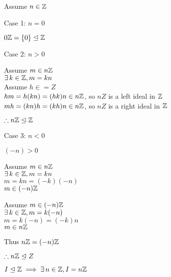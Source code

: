 \documentclass[letterpaper,12pt,fleqn]{article}
\newcommand{\ide}{\trianglelefteq}
\begin{document}
\begin{theproof}
  Assume $n\in\mathbb{Z}$
  
  \begin{description}
  \item Case 1: $n=0$
    
    $0\Z=\{0\}\ide\Z$

  \item Case 2: $n>0$

    Assume $m\in n\mathbb{Z}$ \\
    $\exists\,k\in\mathbb{Z},m=kn$ \\
    Assume $h\in=Z$ \\
    $hm=h(kn)=(hk)n\in n\mathbb{Z}$, so $nZ$ is a left ideal in $\mathbb{Z}$ \\
    $mh=(kn)h=(kh)n\in n\mathbb{Z}$, so $nZ$ is a right ideal in $\mathbb{Z}$

    $\therefore n\Z\ide\Z$

  \item Case 3: $n<0$

    $(-n)>0$

    Assume $m\in n\mathbb{Z}$ \\
    $\exists\,k\in\mathbb{Z},m=kn$ \\
    $m=kn=(-k)(-n)$ \\
    $m\in (-n)\mathbb{Z}$

    Assume $m\in(-n)\mathbb{Z}$ \\
    $\exists\,k\in\mathbb{Z},m=k(-n)$ \\
    $m=k(-n)=(-k)n$ \\
    $m\in n\mathbb{Z}$

    Thus $n\mathbb{Z}=(-n)\mathbb{Z}$

    $\therefore n\Z\ide Z$
  \end{description}
\end{theproof}

\begin{theorem}
  $I\ide\Z\implies\exists\,n\in\Z,I=n\Z$
\end{theorem}
\end{document}
